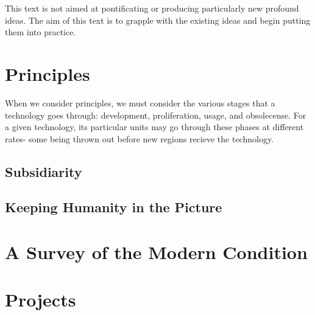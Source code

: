 \documentclass[10pt,letterpaper,openany]{book}
\begin{document}
This text is not aimed at pontificating or producing particularly new profound ideas. The aim of this text is to grapple with the existing ideas and begin putting them into practice.

\section{Principles}

When we consider principles, we must consider the various stages that a technology goes through: development, proliferation, usage, and obsolecense. For a given technology, its particular units may go through these phases at different rates- some being thrown out before new regions recieve the technology.

\subsection{Subsidiarity}

\subsection{Keeping Humanity in the Picture}

\section{A Survey of the Modern Condition}

\section{Projects}
\end{document}
